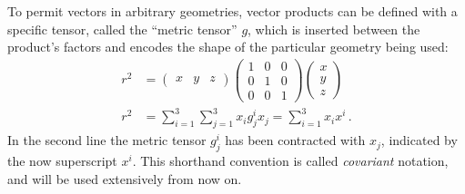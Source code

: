     To permit vectors in arbitrary geometries,
        vector products can be defined with a specific tensor, called the ``metric tensor'' $g$,
        which is inserted between the product's factors and encodes the shape of the particular geometry being used:
    \begin{equation} \begin{split}
        r^2 &= \begin{pmatrix} x & y & z\end{pmatrix}
            \begin{pmatrix}
                1 & 0 & 0 \\
                0 & 1 & 0 \\
                0 & 0 & 1
            \end{pmatrix}
            \begin{pmatrix} x \\ y \\ z \end{pmatrix} \\
        r^2 &= \sum\limits_{i=1}^3 \sum\limits_{j=1}^3 x_i g^i_j x_j
            = \sum\limits_{i=1}^3 x_i x^i
        \,.
    \end{split} \end{equation}
    In the second line the metric tensor $g^i_j$ has been contracted with $x_j$,
        indicated by the now superscript $x^i$.
    This shorthand convention is called \textit{covariant} notation, and will be used extensively from now on.

